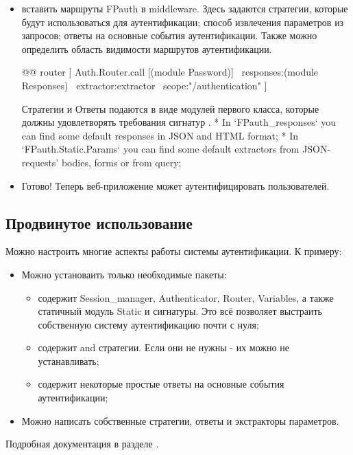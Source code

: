 \begin{itemize}\item{вставить маршруты FPauth в  middleware. Здесь задаются стратегии, которые будут использоваться для аутентификации; способ извлечения параметров из запросов; ответы на основные события аутентификации. Также можно определить область видимости маршрутов аутентификации.\medbreak
\begin{ocamlcodeblock}
@@ router [
    Auth.Router.call [(module Password)] ~responses:(module Responses) ~extractor:extractor ~scope:"/authentication"
]
\end{ocamlcodeblock}\medbreak
Стратегии и Ответы подаются в виде модулей первого класса, которые должны удовлетворять требования сигнатур \hyperref[page-FPauth-core-module-FPauth+u+core-module-Auth+u+sign-module-type-STRATEGY]{}. * In `FPauth\_responses` you can find some default responses in JSON and HTML format; * In `FPauth.Static.Params` you can find some default extractors from JSON-requests' bodies, forms or from query;

}\end{itemize}%
\begin{itemize}\item{Готово! Теперь веб-приложение может аутентифицировать пользователей.}\end{itemize}%
\subsection{Продвинутое использование\label{Продвинутое-использование}}%
Можно настроить многие аспекты работы системы аутентификации. К примеру:

\begin{itemize}\item{Можно установаить только необходимые пакеты:

\begin{itemize}\item{ содержит Session\_manager, Authenticator, Router, Variables, а также статичный модуль Static и сигнатуры. Это всё позволяет выстраить собственную систему аутентификацию почти с нуля;}%
\item{ содержит  and  стратегии. Если они не нужны - их можно не устанавливать;}%
\item{ содержит некоторые простые ответы на основные события аутентификации;}\end{itemize}%
}%
\item{Можно написать собственные стратегии, ответы и экстракторы параметров.}\end{itemize}%
Подробная документация в разделе \hyperref[page-FPauth-module-FPauth]{}{}.%


